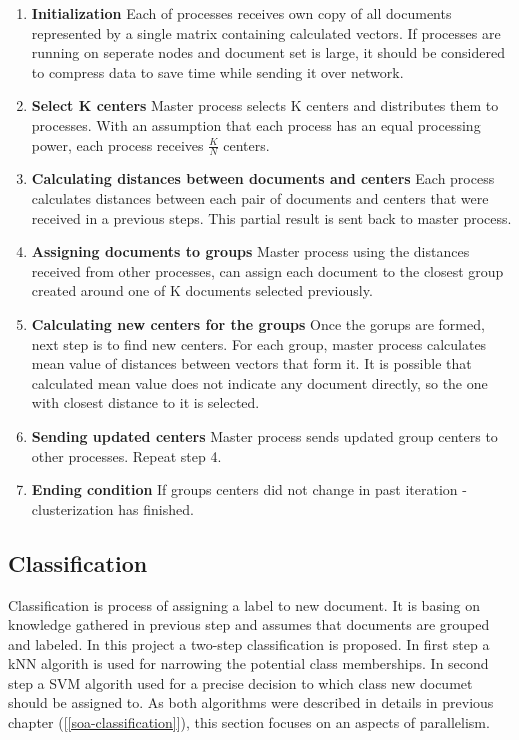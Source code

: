 \begin{enumerate}
	\item \textbf{Initialization}\newline
	Each of processes receives own copy of all documents represented by a single matrix containing calculated vectors. If processes are running on seperate nodes and document set is large, it should be considered to compress data to save time while sending it over network.
	
	\item \textbf{Select K centers}\newline
	Master process selects K centers and distributes them to processes. With an assumption that each process has an equal processing power, each process receives \(\frac{K}{N}\) centers.
	
	\item \textbf{Calculating distances between documents and centers}\newline
	Each process calculates distances between each pair of documents and centers that were received in a previous steps. This partial result is sent back to master process.
	
	\item \textbf{Assigning documents to groups}\newline
	Master process using the distances received from other processes, can assign each document to the closest group created around one of K documents selected previously.
	
	\item \textbf{Calculating new centers for the groups}\newline
	Once the gorups are formed, next step is to find new centers. For each group, master process calculates mean value of distances between vectors that form it. It is possible that calculated mean value does not indicate any document directly, so the one with closest distance to it is selected.
	
	\item \textbf{Sending updated centers}\newline
	Master process sends updated group centers to other processes. Repeat step 4.
	
	\item \textbf{Ending condition}\newline
	If groups centers did not change in past iteration - clusterization has finished.
\end{enumerate}

\subsection{Classification}
Classification is process of assigning a label to new document. It is basing on knowledge gathered in previous step and assumes that documents are grouped and labeled. In this project a two-step classification is proposed. In first step a kNN algorith is used for narrowing the potential class memberships. In second step a SVM algorith used for a precise decision to which class new documet should be assigned to. As both algorithms were described in details in previous chapter ([\ref{soa-classification}]), this section focuses on an aspects of parallelism.

